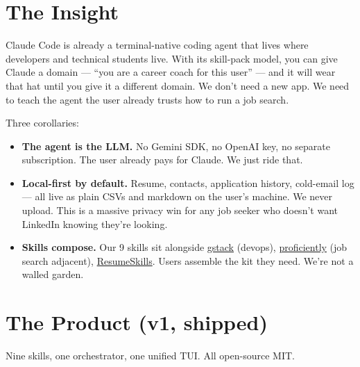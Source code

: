 \documentclass[11pt]{article}
\begin{document}
\section{The Insight}

Claude Code is already a terminal-native coding agent that lives where developers and technical students live. With its skill-pack model, you can give Claude a domain --- ``you are a career coach for this user'' --- and it will wear that hat until you give it a different domain. We don't need a new app. We need to teach the agent the user already trusts how to run a job search.

Three corollaries:

\begin{itemize}
  \item \textbf{The agent is the LLM.} No Gemini SDK, no OpenAI key, no separate subscription. The user already pays for Claude. We just ride that.
  \item \textbf{Local-first by default.} Resume, contacts, application history, cold-email log --- all live as plain CSVs and markdown on the user's machine. We never upload. This is a massive privacy win for any job seeker who doesn't want LinkedIn knowing they're looking.
  \item \textbf{Skills compose.} Our 9 skills sit alongside \href{https://github.com/garrytan/gstack}{gstack} (devops), \href{https://github.com/proficiently/claude-skills}{proficiently} (job search adjacent), \href{https://github.com/jmagar/ResumeSkills}{ResumeSkills}. Users assemble the kit they need. We're not a walled garden.
\end{itemize}

\section{The Product (v1, shipped)}

Nine skills, one orchestrator, one unified TUI. All open-source MIT.
\end{document}
